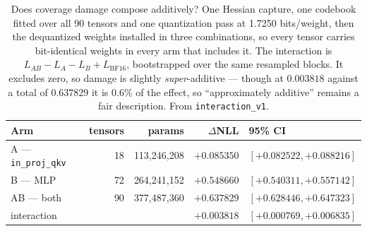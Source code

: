 \begin{table}[t]
\centering
\small
\begin{tabular}{lrrrl}
\toprule
Arm & tensors & params & $\Delta$NLL & 95\% CI \\
\midrule
A --- \texttt{in\_proj\_qkv} & 18 & 113,246,208 & $+0.085350$ & $[+0.082522, +0.088216]$ \\
B --- MLP & 72 & 264,241,152 & $+0.548660$ & $[+0.540311, +0.557142]$ \\
AB --- both & 90 & 377,487,360 & $+0.637829$ & $[+0.628446, +0.647323]$ \\
\midrule
interaction & & & $+0.003818$ & $[+0.000769, +0.006835]$ \\
\bottomrule
\end{tabular}
\caption{Does coverage damage compose additively? One Hessian capture, one codebook fitted over all 90 tensors and one quantization pass at 1.7250 bits/weight, then the dequantized weights installed in three combinations, so every tensor carries bit-identical weights in every arm that includes it. The interaction is $L_{AB}-L_A-L_B+L_{\mathrm{BF16}}$, bootstrapped over the same resampled blocks. It excludes zero, so damage is slightly \emph{super}-additive --- though at $0.003818$ against a total of $0.637829$ it is 0.6\% of the effect, so ``approximately additive'' remains a fair description. From \texttt{interaction\_v1}.}
\label{tab:interaction}
\end{table}
